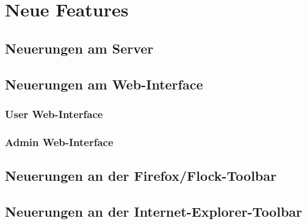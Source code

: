 \chapter{Neue Features}
\section{Neuerungen am Server}
\section{Neuerungen am Web-Interface}
\subsection{User Web-Interface}
\subsection{Admin Web-Interface}
\section{Neuerungen an der Firefox/Flock-Toolbar}
\section{Neuerungen an der Internet-Explorer-Toolbar}

